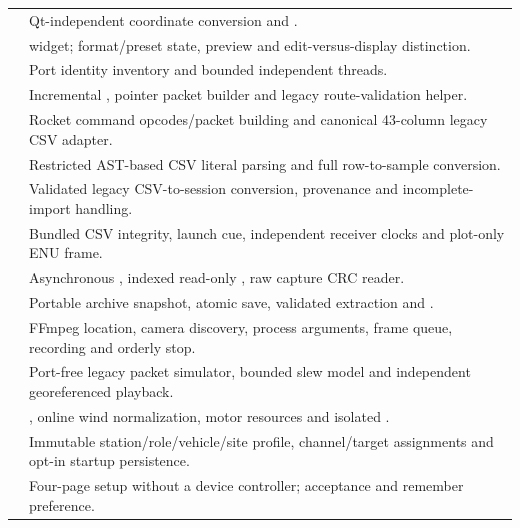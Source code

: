 \begin{longtable}{@{}L{.29\linewidth}L{.64\linewidth}@{}}
 & Qt-independent coordinate conversion and . \\
 &  widget; format/preset state, preview and edit-versus-display distinction. \\
 & Port identity inventory and bounded independent  threads. \\
 & Incremental , pointer packet builder and legacy route-validation helper. \\
 & Rocket command opcodes/packet building and canonical 43-column legacy CSV adapter. \\
 & Restricted AST-based CSV literal parsing and full row-to-sample conversion. \\
 & Validated legacy CSV-to-session conversion, provenance and incomplete-import handling. \\
 & Bundled CSV integrity, launch cue, independent receiver clocks and plot-only ENU frame. \\
 & Asynchronous , indexed read-only , raw capture CRC reader. \\
 & Portable archive snapshot, atomic save, validated extraction and . \\
 & FFmpeg location, camera discovery, process arguments, frame queue, recording and orderly stop. \\
 & Port-free legacy packet simulator, bounded slew model and independent georeferenced  playback. \\
 & , online wind normalization, motor resources and isolated . \\
 & Immutable station/role/vehicle/site profile, channel/target assignments and opt-in startup persistence. \\
 & Four-page setup without a device controller; acceptance and remember preference. \\

\end{longtable}
